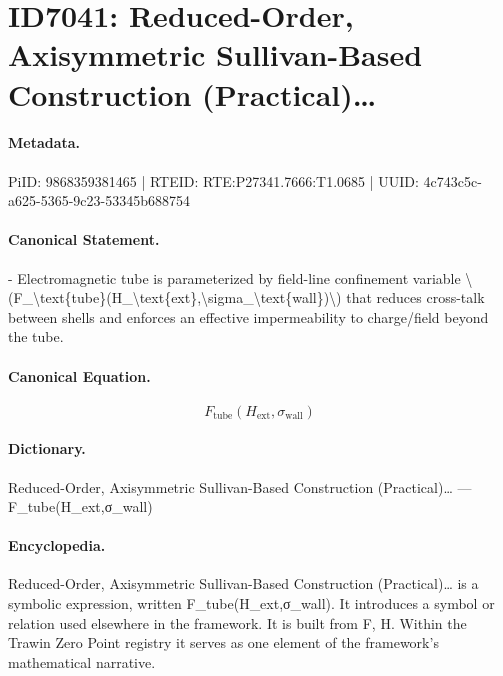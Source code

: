 \section*{ID7041: Reduced-Order, Axisymmetric Sullivan-Based Construction (Practical)…}
\paragraph{Metadata.}
PiID: 9868359381465 | RTEID: RTE:P27341.7666:T1.0685 | UUID: 4c743c5c-a625-5365-9c23-53345b688754

\paragraph{Canonical Statement.}
- Electromagnetic tube is parameterized by field-line confinement variable \textbackslash{}(F\_\textbackslash{}text\{tube\}(H\_\textbackslash{}text\{ext\},\textbackslash{}sigma\_\textbackslash{}text\{wall\})\textbackslash{}) that reduces cross-talk between shells and enforces an effective impermeability to charge/field beyond the tube.

\paragraph{Canonical Equation.}
\[
F_\text{tube}(H_\text{ext},\sigma_\text{wall})
\]

\paragraph{Dictionary.}
Reduced-Order, Axisymmetric Sullivan-Based Construction (Practical)… — F\_tube(H\_ext,σ\_wall)

\paragraph{Encyclopedia.}
Reduced-Order, Axisymmetric Sullivan-Based Construction (Practical)… is a symbolic expression, written F\_tube(H\_ext,σ\_wall). It introduces a symbol or relation used elsewhere in the framework. It is built from F, H. Within the Trawin Zero Point registry it serves as one element of the framework's mathematical narrative.
